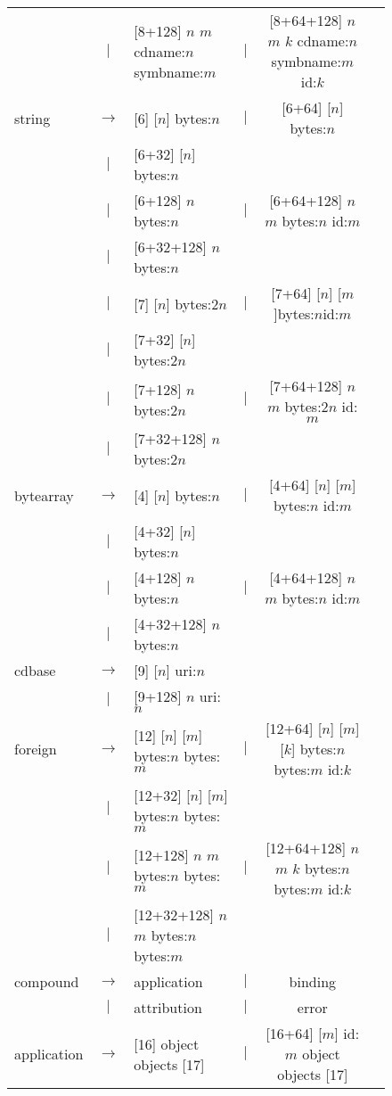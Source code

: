 \begin{figure}
\begin{center}
\begin{tabular}{lcp{6cm}lcp{5cm}}
       & $|$ & [8+128] {$n$} {$m$} cdname:$n$ symbname:$m$
       & $|$ & [8+64+128] {$n$} {$m$} {$k$} cdname:$n$ symbname:$m$ id:$k$\\
    string  & $\longrightarrow$& [6] [$n$] bytes:$n$
       & $|$ & [6+64] [$n$] bytes:$n$\\
       & $|$ & [6+32] [$n$] bytes:$n$ & & \\
       & $|$ & [6+128] {$n$} bytes:$n$
       & $|$ & [6+64+128] {$n$} {$m$} bytes:$n$ id:$m$\\
       & $|$ & [6+32+128] {$n$} bytes:$n$
       & & \\
       & $|$ & [7] [$n$] bytes:$2n$ 
       & $|$ & [7+64] [$n$] [$m$]bytes:$n$id:$m$ \\
       & $|$ & [7+32] [$n$] bytes:$2n$
       & & \\
       & $|$ & [7+128] {$n$} bytes:$2n$
       & $|$ & [7+64+128] {$n$} {$m$} bytes:$2n$ id:$m$\\
       & $|$ & [7+32+128] {$n$} bytes:$2n$ &&\\
   bytearray  & $\longrightarrow$& [4] [$n$] bytes:$n$
       & $|$ & [4+64] [$n$] [$m$] bytes:$n$ id:$m$\\
       & $|$ & [4+32] [$n$] bytes:$n$ && \\
       & $|$ & [4+128] {$n$} bytes:$n$
       & $|$ & [4+64+128] {$n$} {$m$} bytes:$n$ id:$m$\\
       & $|$ & [4+32+128] {$n$} bytes:$n$ && \\
    cdbase & $\longrightarrow$& [9] [$n$] uri:$n$ 
       &&\\
       & $|$ & [9+128] {$n$} uri:$n$ && \\
    foreign &$\longrightarrow$& [12] [$n$] [$m$] bytes:$n$ bytes:$m$
       & $|$ & [12+64] [$n$] [$m$] [$k$] bytes:$n$ bytes:$m$ id:$k$ \\
       & $|$ & [12+32] [$n$] [$m$] bytes:$n$ bytes:$m$ 
       &    & \\
       & $|$ & [12+128] {$n$} {$m$} bytes:$n$ bytes:$m$
       & $|$ & [12+64+128] {$n$} {$m$} {$k$} bytes:$n$ bytes:$m$ id:$k$\\
       & $|$ & [12+32+128] {$n$} {$m$} bytes:$n$ bytes:$m$
       &    &\\
   compound & $\longrightarrow$& application
      & $|$ & binding \\
      & $|$ & attribution
      & $|$ & error \\
   application & $\longrightarrow$ & [16] object objects [17] 
       & $|$ & [16+64] [$m$] id:$m$ object objects [17]\\

\end{tabular}
\end{center}
\end{figure}
